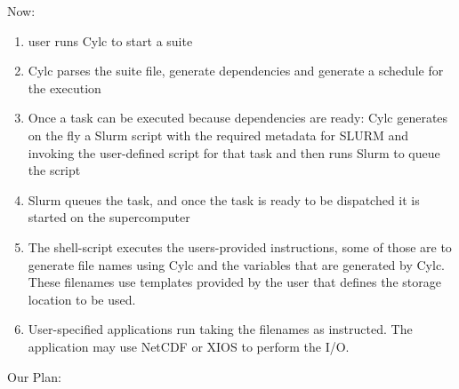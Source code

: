 \documentclass[a4paper]{article}
\begin{document}
Now:
\begin{enumerate}
  \item user runs Cylc to start a suite
  \item Cylc parses the suite file, generate dependencies and generate a schedule for the execution
  \item Once a task can be executed because dependencies are ready: Cylc generates on the fly a Slurm script with the required metadata for SLURM and invoking the user-defined script for that task and then runs Slurm to queue the script
  \item Slurm queues the task, and once the task is ready to be dispatched it is started on the supercomputer
  \item The shell-script executes the users-provided instructions, some of those are to generate file names using Cylc and the variables that are generated by Cylc. These filenames use templates provided by the user that defines the storage location to be used.
  \item User-specified applications run taking the filenames as instructed.
  The application may use NetCDF or XIOS to perform the I/O.

\end{enumerate}

Our Plan:
\end{document}
